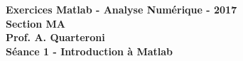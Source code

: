 \begin{center}
  \textbf{Exercices Matlab - Analyse Numérique - 2017 \\
  Section MA \\
  Prof. A. Quarteroni \\
  Séance 1 - Introduction à Matlab}
\end{center}


\vspace{10mm}

\begin{ex}

\end{ex}

\begin{sol}

\end{sol}

\begin{ex}

\end{ex}

\begin{sol}

\end{sol}

\begin{ex}

\end{ex}

\begin{sol}

\end{sol}

\begin{ex}

\end{ex}

\begin{sol}

\end{sol}

\begin{ex}

\end{ex}

\begin{sol}

\end{sol}


